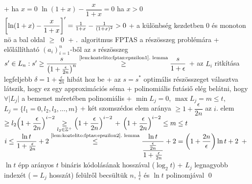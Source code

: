   + ha $x = 0$ \RA $\ln (1 + x) - \dfrac{x}{1 + x} = 0$\qquad
    ha $x > 0$ \RA $\mleft[\ln (1 + x) - \dfrac{x}{1 + x} \mright]' =
    \frac{1}{1 + x} - \frac{1}{(1 + x)^2} > 0$
  + a különbség kezdetben $0$ és monoton nö \RA a bal oldal $\ge$ \qed
+ \thm {}.~algoritmus FPTAS a részösszeg
  problémára
  + \proof előlállítható $(a_i)_{i = 1}^n$-ből az $s$ részösszeg \RA $s'
    \in L_n : s' \ge \dfrac{s}{\bigl(1 + \frac{\epsilon}{2n}\bigr)^n}
    \overset{\text{\ref{lem:koztelito:fptas:epszilon1}.~lemma}}{\ge}
    \dfrac{s}{1 + \epsilon}$
    + az $L_i$ ritkítása legfeljebb $\delta = 1 + \frac{\epsilon}{2n}$
      hibát hoz be
    + az $s = s^*$ optimális részösszeget választva látszik, hogy
      ez egy approximációs séma
  + polinomiális futásiő \LA elég belátni, hogy $\forall \lvert L_j \rvert$ a
    bemenet méretében polinomiális
    + $\min L_j = 0$, $\max L_j = m \le t$, $L_j = \{ l_1 = 0, l_2, l_3,
      \ldots, m \}$
    + két szomszédos elem aránya $\ge 1 + \dfrac{\epsilon}{2n}$ \RA az
      $i$. elem $\ge l_2 \mleft(1 + \dfrac{\epsilon}{2n}\mright)^{i - 2}
      \underset{l_2 \in \ZZ^+}{\ge} \mleft(1 +
      \dfrac{\epsilon}{2n}\mright)^{i - 2}$
    + $\mleft(1 + \dfrac{\epsilon}{2n}\mright)^{i - 2} \le m \le t$
      \RA $i \le \dfrac{\ln t}{1 + \frac{\epsilon}{2n}} + 2
      \overset{\text{\ref{lem:koztelito:fptas:epszilon2}.~lemma}}{\le}
      \dfrac{\ln t}{\dfrac{\frac{\epsilon}{2n}}{1 +
          \frac{\epsilon}{2n}}} + 2 = \mleft(1 +
      \dfrac{2n}{\epsilon}\mright) \ln t + 2$
      + $\ln t$ épp arányos $t$ bináris kódolásának hosszával ($\log_2
        t$)
      + $L_j$ legnagyobb indexét ($= L_j$ hosszát) felülről becsültük
        $n$, $\frac{1}{\epsilon}$ és $\ln t$ polinomjával \qed


